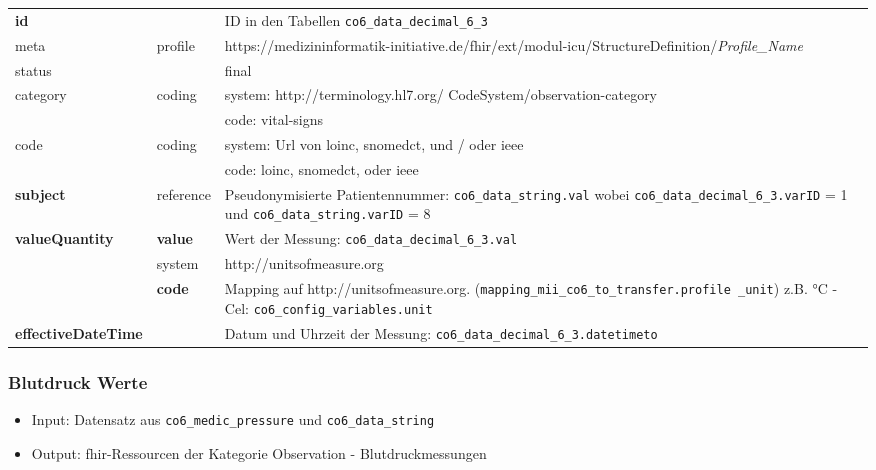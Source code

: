 \begin{longtable}{|l|l|p{7.5cm}|} 
	\hline
	\rowcolor{lightgray} \multicolumn{3}{|l|}{Data Mapping (inhaltlich) - nummerische Werte} \\ \hline
	\textbf{id} &  & ID in den Tabellen \texttt{co6\_data\_decimal\_6\_3} \\ \hline
	meta & profile & https://medizininformatik-initiative.de/fhir/ext/modul-icu/StructureDefinition/\textsl{Profile\_Name} \\ \hline 
	status &  & final  \\ \hline 
	category & coding & system: http://terminology.hl7.org/ CodeSystem/observation-category \\ 
	\cline{3-3}
	& & code: vital-signs \\ \hline
	code & coding & system: Url von \ac{loinc}, \ac{snomedct}, und / oder \ac{ieee} \\ 
	\cline{3-3} 
	 & & code: \ac{loinc}, \ac{snomedct}, oder \ac{ieee} \\ \hline
	\textbf{subject} & reference & Pseudonymisierte Patientennummer: \texttt{co6\_data\_string.val} wobei \texttt{co6\_data\_decimal\_6\_3.varID} = 1 und \texttt{co6\_data\_string.varID} = 8 \\ \hline
	\textbf{valueQuantity} & \textbf{value} & Wert der Messung: \texttt{co6\_data\_decimal\_6\_3.val} \\
	\cline{2-3}
	 & system & http://unitsofmeasure.org \\ 
	 \cline{2-3}
	 & \textbf{code} & Mapping auf http://unitsofmeasure.org. (\texttt{mapping\_mii\_co6\_to\_transfer.profile \_unit}) z.B. °C - Cel: \texttt{co6\_config\_variables.unit} \\ \hline
    \textbf{effectiveDateTime} & & Datum und Uhrzeit der Messung: \texttt{co6\_data\_decimal\_6\_3.datetimeto} \\ \hline
\end{longtable}

\subsubsection{Blutdruck Werte} \label{subsub:bloodpressure}

\begin{itemize}
\item Input: Datensatz aus \texttt{co6\_medic\_pressure} und \texttt{co6\_data\_string}
\item Output: \ac{fhir}-Ressourcen der Kategorie \glqq Observation\grqq{} - Blutdruckmessungen
\end{itemize}

